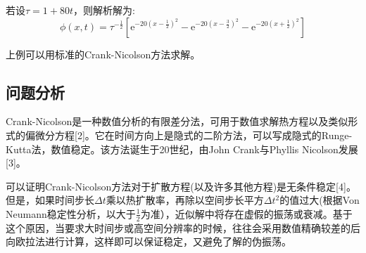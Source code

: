 \documentclass[twoside,twocolumn]{article}
\begin{document}
\begin{CJK*}{UTF8}{gkai}
若设$\tau=1+80t$，则解析解为:
\begin{equation*}
\phi(x,t)=\tau^{-\frac{1}{2}}[\mathrm{e}^{-20(x-\frac{1}{2})^{2}}-\mathrm{e}^{-20(x-\frac{3}{2})^{2}}-\mathrm{e}^{-20(x+\frac{1}{2})^{2}}]
\end{equation*}

上例可以用标准的Crank-Nicolson方法求解。
\subsection{问题分析}
Crank-Nicolson是一种数值分析的有限差分法，可用于数值求解热方程以及类似形式的偏微分方程[2]。它在时间方向上是隐式的二阶方法，可以写成隐式的Runge-Kutta法，数值稳定。该方法诞生于20世纪，由John Crank与Phyllis Nicolson发展[3]。

可以证明Crank-Nicolson方法对于扩散方程(以及许多其他方程)是无条件稳定[4]。但是，如果时间步长$\Delta t$乘以热扩散率，再除以空间步长平方$\Delta t^{2}$的值过大(根据Von Neumann稳定性分析，以大于$\frac{1}{2}$为准），近似解中将存在虚假的振荡或衰减。基于这个原因，当要求大时间步或高空间分辨率的时候，往往会采用数值精确较差的后向欧拉法进行计算，这样即可以保证稳定，又避免了解的伪振荡。

\end{CJK*}
\end{document}

